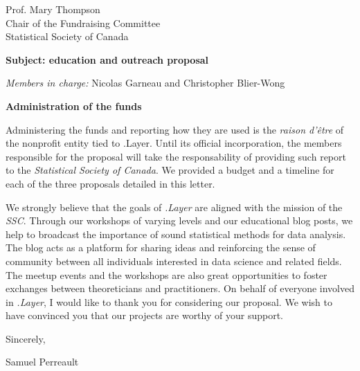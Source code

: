 \documentclass[11pt, a4paper]{letter} %
\begin{document}
\begin{letter}{
	Prof. Mary Thompson\\
	Chair of the Fundraising Committee\\
	Statistical Society of Canada
	
	\bigskip
	\textbf{Subject: education and outreach proposal}%
}
\begin{enumerate}
			
	\bigskip
	\emph{Members in charge:} Nicolas Garneau and Christopher Blier-Wong\\
	
\end{enumerate}


\bigskip
\noindent \textbf{Administration of the funds}

Administering the funds and reporting how they are used is the \emph{raison d'\^{e}tre} of the nonprofit entity tied to .Layer. Until its official incorporation, the members responsible for the proposal will take the responsability of providing such report to the \emph{Statistical Society of Canada}. We provided a budget and a timeline for each of the three proposals detailed in this letter.

\bigskip

We strongly believe that the goals of \emph{.Layer} are aligned with the mission of the \emph{SSC}. Through our workshops of varying levels and our educational blog posts, we help to broadcast the importance of sound statistical methods for data analysis. The blog acts as a platform for sharing ideas and reinforcing the sense of community between all individuals interested in data science and related fields. The meetup events and the workshops are also great opportunities to foster exchanges between theoreticians and practitioners. On behalf of everyone involved in \emph{.Layer}, I would like to thank you for considering our proposal. We wish to have convinced you that our projects are worthy of your support.

\closing{Sincerely,}

\noindent Samuel Perreault




\end{letter}
\end{document}
